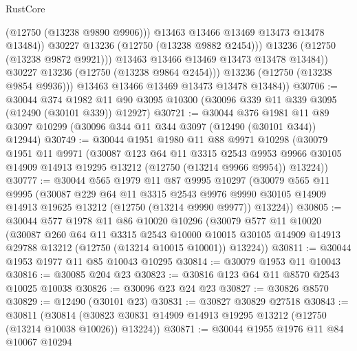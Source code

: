 \begin{lexlean}{RustCore}
\begin{coremodule}
                          (@12750 (@13238 @9890 @9906)))
                        @13463
                        @13466
                        @13469
                        @13473
                        @13478
                        @13484))
                    @30227
                    @13236
                    (@12750 (@13238 @9882 @2454)))
                  @13236
                  (@12750 (@13238 @9872 @9921)))
                @13463
                @13466
                @13469
                @13473
                @13478
                @13484))
            @30227
            @13236
            (@12750 (@13238 @9864 @2454)))
          @13236
          (@12750 (@13238 @9854 @9936)))
        @13463
        @13466
        @13469
        @13473
        @13478
        @13484))
@30706 := @30044
    @374
    @1982
    @11
    @90
    @3095
    @10300
    (@30096 @339 @11 @339 @3095 (@12490 (@30101 @339)) @12927)
@30721 := @30044
    @376
    @1981
    @11
    @89
    @3097
    @10299
    (@30096 @344 @11 @344 @3097 (@12490 (@30101 @344)) @12944)
@30749 := @30044
    @1951
    @1980
    @11
    @88
    @9971
    @10298
    (@30079
      @1951
      @11
      @9971
      (@30087
        @123
        @64
        @11
        @3315
        @2543
        @9953
        @9966
        @30105
        @14909
        @14913
        @19295
        @13212
        (@12750 (@13214 @9966 @9954))
        @13224))
@30777 := @30044
    @565
    @1979
    @11
    @87
    @9995
    @10297
    (@30079
      @565
      @11
      @9995
      (@30087
        @229
        @64
        @11
        @3315
        @2543
        @9976
        @9990
        @30105
        @14909
        @14913
        @19625
        @13212
        (@12750 (@13214 @9990 @9977))
        @13224))
@30805 := @30044
    @577
    @1978
    @11
    @86
    @10020
    @10296
    (@30079
      @577
      @11
      @10020
      (@30087
        @260
        @64
        @11
        @3315
        @2543
        @10000
        @10015
        @30105
        @14909
        @14913
        @29788
        @13212
        (@12750 (@13214 @10015 @10001))
        @13224))
@30811 := @30044 @1953 @1977 @11 @85 @10043 @10295
@30814 := @30079 @1953 @11 @10043
@30816 := @30085 @204 @23
@30823 := @30816 @123 @64 @11 @8570 @2543 @10025 @10038
@30826 := @30096 @23 @24 @23
@30827 := @30826 @8570
@30829 := @12490 (@30101 @23)
@30831 := @30827 @30829 @27518
@30843 := @30811
    (@30814 (@30823 @30831 @14909 @14913 @19295 @13212 (@12750 (@13214 @10038 @10026)) @13224))
@30871 := @30044
    @1955
    @1976
    @11
    @84
    @10067
    @10294

\end{coremodule}
\end{lexlean}
